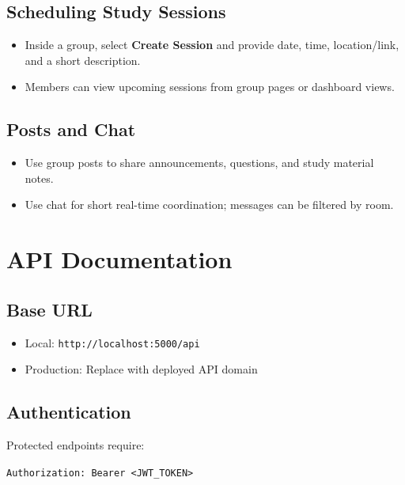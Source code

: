 \documentclass[12pt]{article}
\begin{document}
\subsection{Scheduling Study Sessions}
\begin{itemize}
  \item Inside a group, select \textbf{Create Session} and provide date, time, location/link, and a short description.
  \item Members can view upcoming sessions from group pages or dashboard views.
\end{itemize}

\subsection{Posts and Chat}
\begin{itemize}
  \item Use group posts to share announcements, questions, and study material notes.
  \item Use chat for short real-time coordination; messages can be filtered by room.
\end{itemize}

\newpage

\section{API Documentation}
\subsection{Base URL}
\begin{itemize}
  \item Local: \texttt{http://localhost:5000/api}
  \item Production: Replace with deployed API domain
\end{itemize}

\subsection{Authentication}
Protected endpoints require:
\begin{center}
\texttt{Authorization: Bearer <JWT\_TOKEN>}
\end{center}
\end{document}
